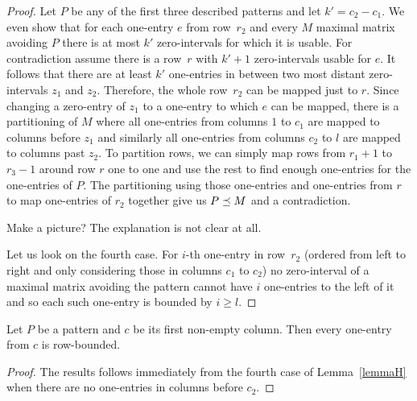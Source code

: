 \begin{proof}
Let $P$ be any of the first three described patterns and let $k'=c_2-c_1$. We even show that for each one-entry $e$ from row~$r_2$ and every $M$ maximal matrix avoiding $P$ there is at most $k'$ zero-intervals for which it is usable. For contradiction assume there is a row~$r$ with $k'+1$ zero-intervals usable for $e$. It follows that there are at least $k'$ one-entries in between two most distant zero-intervals $z_1$ and $z_2$. Therefore, the whole row~$r_2$ can be mapped just to $r$. Since changing a zero-entry of $z_1$ to a one-entry to which $e$ can be mapped, there is a partitioning of $M$ where all one-entries from columns $1$ to $c_1$ are mapped to columns before $z_1$ and similarly all one-entries from columns $c_2$ to $l$ are mapped to columns past $z_2$. To partition rows, we can simply map rows from $r_1+1$ to $r_3-1$ around row $r$ one to one and use the rest to find enough one-entries for the one-entries of $P$. The partitioning using those one-entries and one-entries from $r$ to map one-entries of $r_2$ together give us $P\preceq M$ and a contradiction.

Make a picture? The explanation is not clear at all.

Let us look on the fourth case. For $i$-th one-entry in row~$r_2$ (ordered from left to right and only considering those in columns $c_1$ to $c_2$) no zero-interval of a maximal matrix avoiding the pattern cannot have $i$ one-entries to the left of it and so each such one-entry is bounded by $i\geq l$.
\end{proof}

\begin{lemma}
\label{lemmaFirst}
Let $P$ be a pattern and $c$ be its first non-empty column. Then every one-entry from $c$ is row-bounded.
\end{lemma}

\begin{proof}
The results follows immediately from the fourth case of Lemma~\ref{lemmaH} when there are no one-entries in columns before $c_2$.
\end{proof}

